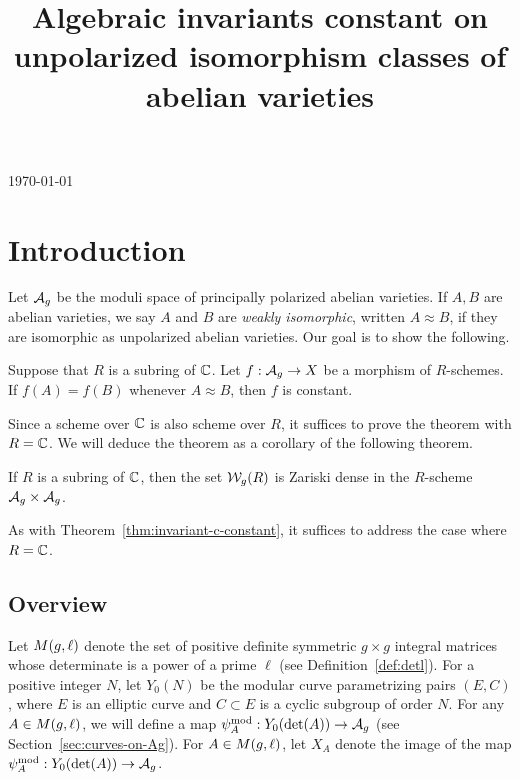 \documentclass{amsart}
\title[Invariants constant on unpolarized isomorphism classes]{Algebraic invariants constant on unpolarized isomorphism classes of abelian varieties}
\begin{document}
\today
\tableofcontents
\maketitle

\section{Introduction}
\label{sec:introduction}

Let $\mathcal{A}_g$ be the moduli space of principally polarized abelian varieties. If $A, B$ are abelian varieties, we say $A$ and $B$ are \emph{weakly isomorphic}, written $A \approx B$, if they are isomorphic as unpolarized abelian varieties. Our goal is to show the following.
\begin{theorem}\label{thm:invariant-c-constant}
  Suppose that $R$ is a subring of $\mathbb{C}$. Let $f: \mathcal{A}_g \to X$ be a morphism of $R$-schemes. If $f(A) = f(B)$ whenever $A \approx B$, then $f$ is constant.
\end{theorem}
Since a scheme over $\mathbb{C}$ is also scheme over $R$, it suffices to prove the theorem with $R = \mathbb{C}$. We will deduce the theorem as a corollary of the following theorem.

\begin{theorem}\label{thm:sg-c-dense}
  If $R$ is a subring of $\mathbb{C}$, then the set $\mathcal{W}_g(R)$ is Zariski dense in the $R$-scheme $\mathcal{A}_g \times \mathcal{A}_g$.
\end{theorem}
As with Theorem~\ref{thm:invariant-c-constant}, it suffices to address the case where $R = \mathbb{C}$.

\subsection{Overview}

Let $M(g,\ell)$ denote the set of positive definite symmetric $g \times g$ integral matrices whose determinate is a power of a prime $\ell$ (see Definition~\ref{def:detl}). For a positive integer $N$, let $Y_0(N)$ be the modular curve parametrizing pairs $(E, C)$, where $E$ is an elliptic curve and $C \subset E$ is a cyclic subgroup of order $N$. For any $A \in M(g,\ell)$, we will define a map $\psi_{A}^\mathrm{mod}: Y_0(\det(A)) \to \mathcal{A}_g$ (see Section~\ref{sec:curves-on-Ag}). For $A \in M(g,\ell)$, let $X_A$ denote the image of the map $\psi_{A}^\mathrm{mod}: Y_0(\det(A)) \to \mathcal{A}_g$.
\end{document}
